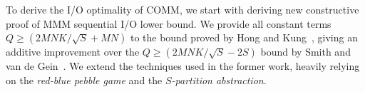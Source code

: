\documentclass[sigplan,review,anonymous]{acmart}\settopmatter{printfolios=true,printccs=false,printacmref=false}
\newcommand\mac[1]{\textcolor{red}{[Mac: #1]}}
\begin{document}
To derive the I/O optimality of COMM, we start with deriving new constructive
proof of MMM sequential I/O lower bound.  We provide all constant terms $Q \ge
(2MNK/\sqrt{S} + MN)$ to the bound proved by Hong and Kung~\cite{redblue},
giving an additive improvement over the  $Q \ge (2MNK/\sqrt{S} 
- 2S)$ bound by Smith and van de Gein~\cite{tightMMM}. We extend the techniques
  used in the former work, heavily relying on the \emph{red-blue pebble game}
  and the \emph{$S$-partition abstraction}. 
%
%
%
%
%
\end{document}
